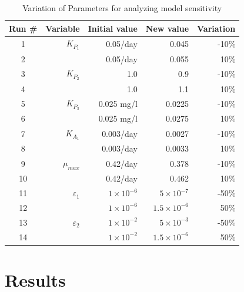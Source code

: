 \documentclass[titlepage,11pt]{article}
\begin{document}
\begin{table}[h]
\begin{center}
\caption{Variation of Parameters for analyzing model sensitivity}
\begin{tabular}{|c|r|r|r|r|}
\hline
{\bf Run \#}& {\bf Variable}     &{\bf Initial value}& {\bf New value}   & {\bf Variation} \\
\hline
          1 &    $K_{P_1}$       &     0.05/day     &       0.045        &  -10\% \\
          2 &                    &     0.05/day     &       0.055        &   10\% \\
 \hline
          3 &    $K_{P_2}$       &        1.0       &         0.9        &  -10\% \\
          4 &                    &        1.0       &         1.1        &   10\% \\
 \hline
          5 &    $K_{P_3}$       &    0.025 mg/l    &       0.0225       &  -10\% \\
          6 &                    &    0.025 mg/l    &       0.0275       &   10\% \\
\hline
          7 &    $K_{A_1}$       &     0.003/day    &      0.0027        &  -10\% \\
          8 &                    &     0.003/day    &      0.0033        &   10\% \\
 \hline
          9 &    $\mu_{max}$     &      0.42/day    &      0.378         &  -10\% \\
         10 &                    &      0.42/day    &      0.462         &   10\% \\
\hline
         11 &  $\varepsilon_1$   & $1\times10^{-6}$ &  $5\times10^{-7}$  &  -50\% \\
         12 &                    & $1\times10^{-6}$ & $1.5\times10^{-6}$ &   50\% \\
\hline
         13 &  $\varepsilon_2$   & $1\times10^{-2}$ &  $5\times10^{-3}$  &  -50\% \\
         14 &                    & $1\times10^{-2}$ & $1.5\times10^{-6}$ &   50\% \\
\hline
\end{tabular}
\end{center}
\end{table}


\section{Results}
\end{document}
